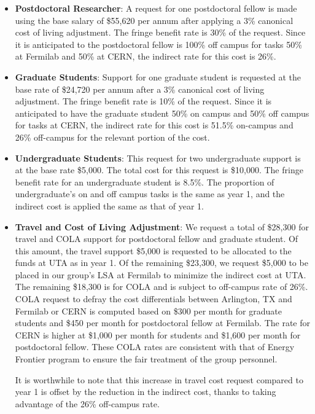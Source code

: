 \begin{enumerate}
\begin{itemize}[noitemsep,nolistsep]
\item {{\bf Postdoctoral Researcher}: A request for one postdoctoral fellow is made using the base salary of \$55,620 per annum after applying a 3\% canonical cost of living adjustment.  The fringe benefit rate is 30\% of the request.  Since it is anticipated to the postdoctoral fellow is 100\% off campus for tasks 50\% at Fermilab and 50\% at CERN, the indirect rate for this cost is 26\%.} 

\item{{\bf Graduate Students}: Support for one graduate student is requested at the base rate of \$24,720 per annum after a 3\% canonical cost of living adjustment.   The fringe benefit rate is 10\% of the request.  Since it is anticipated to have the graduate student 50\% on campus and 50\% off campus for tasks at CERN, the indirect rate for this cost is 51.5\% on-campus and 26\% off-campus for the relevant portion of the cost. }

\item {{\bf Undergraduate Students}: This request for two undergraduate support is at the base rate \$5,000.  The total cost for this request is \$10,000.  The fringe benefit rate for an undergraduate student is 8.5\%.  The proportion of undergraduate’s on and off campus tasks is the same as year 1, and the indirect cost is applied the same as that of year 1.}

\item{{\bf Travel and Cost of Living Adjustment}: We request a total of \$28,300 for travel and COLA support for postdoctoral fellow and graduate student.   Of this amount, the travel support \$5,000 is requested to be allocated to the funds at UTA as in year 1.  Of the remaining \$23,300, we request \$5,000 to be placed in our group’s LSA at Fermilab to minimize the indirect cost at UTA.   The remaining \$18,300 is for COLA and is subject to off-campus rate of 26\%.  COLA request to defray the cost differentials between Arlington, TX and Fermilab or CERN is computed based on \$300 per month for graduate students and \$450 per month for postdoctoral fellow at Fermilab.  The rate for CERN is higher at \$1,000 per month for students and \$1,600 per month for postdoctoral fellow.  These COLA rates are consistent with that of Energy Frontier program to ensure the fair treatment of the group personnel.  

It is worthwhile to note that this increase in travel cost request compared to year 1 is offset by the reduction in the indirect cost, thanks to taking advantage of the 26\% off-campus rate.}


\end{itemize}
\end{enumerate}
